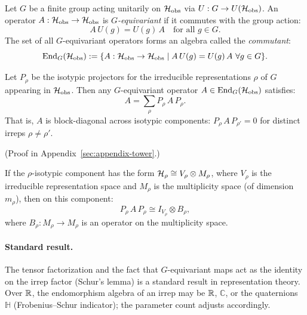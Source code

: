 \begin{definition}
\label{def:commutant}
Let $G$ be a finite group acting unitarily on $\mathcal{H}_{\mathrm{obs}}$ via $U: G \to U(\mathcal{H}_{\mathrm{obs}})$.
An operator $A: \mathcal{H}_{\mathrm{obs}} \to \mathcal{H}_{\mathrm{obs}}$ is \emph{$G$-equivariant} if it commutes with the group action:
\[
A \, U(g) = U(g) \, A \quad \text{for all } g \in G.
\]
The set of all $G$-equivariant operators forms an algebra called the \emph{commutant}:
\[
\mathrm{End}_G(\cH_{\mathrm{obs}}) := \{ A : \cH_{\mathrm{obs}} \to \cH_{\mathrm{obs}} \mid A \, U(g) = U(g) \, A \ \forall g \in G \}.
\]
\end{definition}

\begin{theorem}
\label{thm:normal-form}
Let $P_\rho$ be the isotypic projectors for the irreducible representations $\rho$ of $G$ appearing in $\mathcal{H}_{\mathrm{obs}}$.
Then any $G$-equivariant operator $A \in \mathrm{End}_G(\mathcal{H}_{\mathrm{obs}})$ satisfies:
\[
A = \sum_{\rho} P_\rho \, A \, P_\rho.
\]
That is, $A$ is block-diagonal across isotypic components: $P_\rho \, A \, P_{\rho'} = 0$ for distinct irreps $\rho \ne \rho'$.
\end{theorem}

(Proof in Appendix~\ref{sec:appendix-tower}.)

\begin{corollary}
\label{cor:isotypic-block}
If the $\rho$-isotypic component has the form $\mathcal{H}_\rho \cong V_\rho \otimes M_\rho$, where $V_\rho$ is the irreducible representation space and $M_\rho$ is the multiplicity space (of dimension $m_\rho$), then on this component:
\[
P_\rho \, A \, P_\rho \cong I_{V_\rho} \otimes B_\rho,
\]
where $B_\rho: M_\rho \to M_\rho$ is an operator on the multiplicity space.
\end{corollary}

\paragraph{Standard result.}
The tensor factorization and the fact that $G$-equivariant maps act as the identity on the irrep factor (Schur's lemma) is a standard result in representation theory.
Over $\mathbb{R}$, the endomorphism algebra of an irrep may be $\mathbb{R}$, $\mathbb{C}$, or the quaternions $\mathbb{H}$ (Frobenius--Schur indicator); the parameter count adjusts accordingly.

